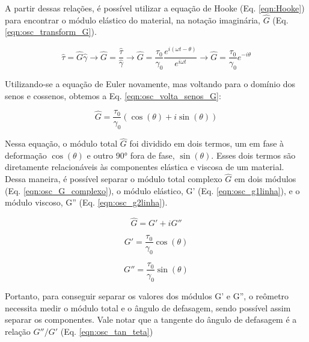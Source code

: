 			A partir dessas relações, é possível utilizar a equação de Hooke (Eq. \ref{eqn:Hooke}) para encontrar o módulo elástico do material, na notação imaginária, \(\hat{G}\) (Eq. \ref{eqn:osc_transform_G}).
			
			\begin{equation}
				\hat{\tau} = \hat{G}\hat{\gamma} \to \hat{G} = \dfrac{\hat{\tau}}{\hat{\gamma}}    \to 
				\hat{G} = \dfrac{\tau_0}{\gamma_0} \dfrac{e^{i(\omega t - \theta)}}{e^{i\omega t}} \to
				\hat{G} = \dfrac{\tau_0}{\gamma_0} e^{-i\theta}
				\label{eqn:osc_transform_G}
			\end{equation}
			
			Utilizando-se a equação de Euler novamente, mas voltando para o domínio dos senos e cossenos, obtemos a Eq. \ref{eqn:osc_volta_senos_G}:
			
			\begin{equation}
				\hat{G} = \dfrac{\tau_0}{\gamma_0} \left( \cos(\theta) + i\sin(\theta) \right)
				\label{eqn:osc_volta_senos_G}
			\end{equation}
			
			Nessa equação, o módulo total \(\hat{G}\) foi dividido em dois termos, um em fase à deformação \(\cos(\theta)\) e outro 90° fora de fase, \(\sin(\theta)\). Esses dois termos são diretamente relacionáveis às componentes elástica e viscosa de um material. Dessa maneira, é possível separar o módulo total complexo \(\hat{G}\) em dois módulos (Eq. \ref{eqn:osc_G_complexo}), o módulo elástico, G' (Eq. \ref{eqn:osc_g1linha}), e o módulo viscoso, G'' (Eq. \ref{eqn:osc_g2linha}).
			
			\begin{equation}
				\hat{G} = G' + iG''
				\label{eqn:osc_G_complexo}
			\end{equation}
			
			\begin{equation}
				G' = \dfrac{\tau_0}{\gamma_0} \cos(\theta)
				\label{eqn:osc_g1linha}
			\end{equation}
			
			\begin{equation}
				G'' = \dfrac{\tau_0}{\gamma_0} \sin(\theta)
				\label{eqn:osc_g2linha}
			\end{equation}
			
			Portanto, para conseguir separar os valores dos módulos G' e G'', o reômetro necessita medir o módulo total e o ângulo de defasagem, sendo possível assim separar os componentes. Vale notar que a tangente do ângulo de defasagem é a relação \(G''/G'\) (Eq. \ref{eqn:osc_tan_teta})
			
